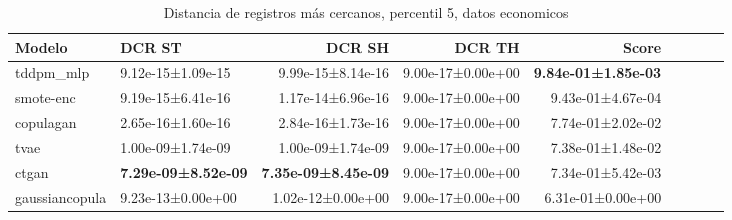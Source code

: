 \begin{table}[H]
\centering
\fontsize{10}{14}\selectfont
\caption{Distancia de registros más cercanos, percentil 5, datos economicos}
\label{table-dcr-economicos-b-5th}
\begin{tabular}{|l|l|r|r|r|r|r|r|r|}
\hline
\rowcolor[gray]{0.8}
Modelo & DCR ST & DCR SH & DCR TH & \textbf{Score} \\
\hline tddpm\_mlp & 9.12e-15±1.09e-15 & 9.99e-15±8.14e-16 & 9.00e-17±0.00e+00 & \bfseries 9.84e-01±1.85e-03 \\
\hline smote-enc & 9.19e-15±6.41e-16 & 1.17e-14±6.96e-16 & 9.00e-17±0.00e+00 & 9.43e-01±4.67e-04 \\
\hline copulagan & \cellcolor[rgb]{0.9, 0.54, 0.52} 2.65e-16±1.60e-16 & \cellcolor[rgb]{0.9, 0.54, 0.52} 2.84e-16±1.73e-16 & 9.00e-17±0.00e+00 & 7.74e-01±2.02e-02 \\
\hline tvae & 1.00e-09±1.74e-09 & 1.00e-09±1.74e-09 & 9.00e-17±0.00e+00 & 7.38e-01±1.48e-02 \\
\hline ctgan & \bfseries 7.29e-09±8.52e-09 & \bfseries 7.35e-09±8.45e-09 & 9.00e-17±0.00e+00 & 7.34e-01±5.42e-03 \\
\hline gaussiancopula & 9.23e-13±0.00e+00 & 1.02e-12±0.00e+00 & 9.00e-17±0.00e+00 & \cellcolor[rgb]{0.9, 0.54, 0.52} 6.31e-01±0.00e+00 \\
\hline
\end{tabular}
\end{table}
